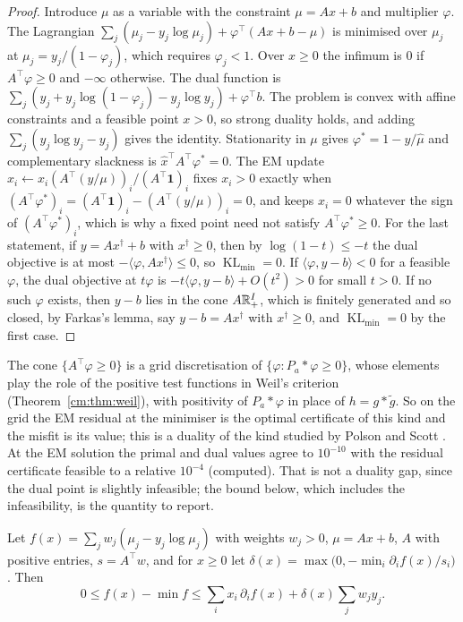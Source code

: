 \begin{proof}
Introduce $\mu$ as a variable with the constraint $\mu=Ax+b$ and multiplier $\varphi$. The Lagrangian $\sum_j(\mu_j-y_j\log\mu_j)+\varphi^\top(Ax+b-\mu)$ is minimised over $\mu_j$ at $\mu_j=y_j/(1-\varphi_j)$, which requires $\varphi_j<1$. Over $x\ge0$ the infimum is $0$ if $A^\top\varphi\ge0$ and $-\infty$ otherwise. The dual function is $\sum_j(y_j+y_j\log(1-\varphi_j)-y_j\log y_j)+\varphi^\top b$. The problem is convex with affine constraints and a feasible point $x>0$, so strong duality holds, and adding $\sum_j(y_j\log y_j-y_j)$ gives the identity. Stationarity in $\mu$ gives $\varphi^*=1-y/\hat\mu$ and complementary slackness is $\hat x^\top A^\top\varphi^*=0$. The EM update $x_i\leftarrow x_i(A^\top(y/\mu))_i/(A^\top\mathbf 1)_i$ fixes $x_i>0$ exactly when $(A^\top\varphi^*)_i=(A^\top\mathbf 1)_i-(A^\top(y/\mu))_i=0$, and keeps $x_i=0$ whatever the sign of $(A^\top\varphi^*)_i$, which is why a fixed point need not satisfy $A^\top\varphi^*\ge0$. For the last statement, if $y=Ax^\dagger+b$ with $x^\dagger\ge0$, then by $\log(1-t)\le-t$ the dual objective is at most $-\langle\varphi,Ax^\dagger\rangle\le0$, so $\operatorname{KL}_{\min}=0$. If $\langle\varphi,y-b\rangle<0$ for a feasible $\varphi$, the dual objective at $t\varphi$ is $-t\langle\varphi,y-b\rangle+O(t^2)>0$ for small $t>0$. If no such $\varphi$ exists, then $y-b$ lies in the cone $A\mathbb{R}^I_+$, which is finitely generated and so closed, by Farkas's lemma, say $y-b=Ax^\dagger$ with $x^\dagger\ge0$, and $\operatorname{KL}_{\min}=0$ by the first case.
\end{proof}

The cone $\{A^\top\varphi\ge0\}$ is a grid discretisation of $\{\varphi:P_a*\varphi\ge0\}$, whose elements play the role of the positive test functions in Weil's criterion (Theorem~\ref{cm:thm:weil}), with positivity of $P_a*\varphi$ in place of $h=g*\tilde g$. So on the grid the EM residual at the minimiser is the optimal certificate of this kind and the misfit is its value; this is a duality of the kind studied by Polson and Scott \cite{PolsonScott16}. At the EM solution the primal and dual values agree to $10^{-10}$ with the residual certificate feasible to a relative $10^{-4}$ (computed). That is not a duality gap, since the dual point is slightly infeasible; the bound below, which includes the infeasibility, is the quantity to report.

\begin{proposition}\label{cx:prop:cert}
Let $f(x)=\sum_jw_j(\mu_j-y_j\log\mu_j)$ with weights $w_j>0$, $\mu=Ax+b$, $A$ with positive entries, $s=A^\top w$, and for $x\ge0$ let $\delta(x)=\max\bigl(0,-\min_i\partial_if(x)/s_i\bigr)$. Then
\[
0\le f(x)-\min f\le\sum_ix_i\,\partial_if(x)+\delta(x)\sum_jw_jy_j.
\]
\end{proposition}

